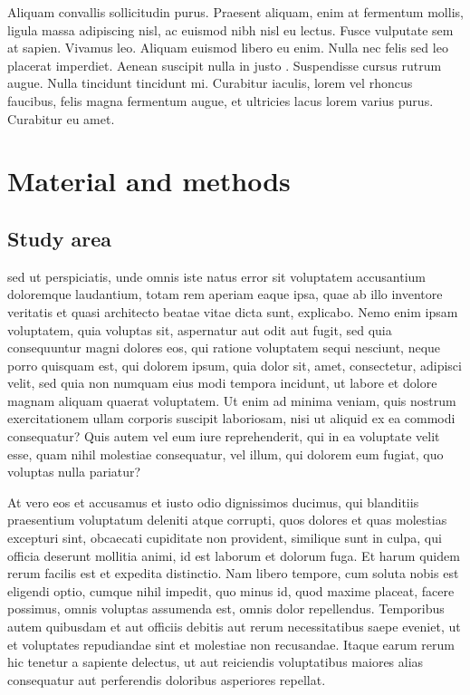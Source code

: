\documentclass[a4paper,12pt]{article}
\begin{document}
Aliquam convallis sollicitudin purus. Praesent aliquam, enim at fermentum mollis, ligula
massa adipiscing nisl, ac euismod nibh nisl eu lectus. Fusce vulputate sem at
sapien. Vivamus leo. Aliquam euismod libero eu enim. Nulla nec felis sed leo placerat
imperdiet. Aenean suscipit nulla in justo
. Suspendisse cursus rutrum augue. Nulla
tincidunt tincidunt mi. Curabitur iaculis, lorem vel rhoncus faucibus, felis magna
fermentum augue, et ultricies lacus lorem varius purus. Curabitur eu amet.


\section*{Material and methods}


\subsection*{Study area}

sed ut perspiciatis, unde omnis iste natus error sit voluptatem
accusantium doloremque laudantium, totam rem aperiam eaque ipsa, quae ab illo inventore
veritatis et quasi architecto beatae vitae dicta sunt, explicabo. Nemo enim ipsam
voluptatem, quia voluptas sit, aspernatur aut odit aut fugit, sed quia consequuntur magni
dolores eos, qui ratione voluptatem sequi nesciunt, neque porro quisquam est, qui dolorem
ipsum, quia dolor sit, amet, consectetur, adipisci velit, sed quia non numquam eius modi
tempora incidunt, ut labore et dolore magnam aliquam quaerat voluptatem. Ut enim ad minima
veniam, quis nostrum exercitationem ullam corporis suscipit laboriosam, nisi ut aliquid ex
ea commodi consequatur? Quis autem vel eum iure reprehenderit, qui in ea voluptate velit
esse, quam nihil molestiae consequatur, vel illum, qui dolorem eum fugiat, quo voluptas
nulla pariatur? 

At vero eos et accusamus et iusto odio dignissimos ducimus, qui blanditiis praesentium
voluptatum deleniti atque corrupti, quos dolores et quas molestias excepturi sint,
 obcaecati cupiditate non provident,
similique sunt in culpa, qui officia deserunt mollitia animi, id est laborum et dolorum
fuga. Et harum quidem rerum facilis est et expedita distinctio. Nam libero tempore, cum
soluta nobis est eligendi optio, cumque nihil impedit, quo minus id, quod maxime placeat,
facere possimus, omnis voluptas assumenda est, omnis dolor repellendus. Temporibus autem
quibusdam et aut officiis debitis aut rerum necessitatibus saepe eveniet, ut et voluptates
repudiandae sint et molestiae non recusandae. Itaque earum rerum hic tenetur a sapiente
delectus, ut aut reiciendis voluptatibus maiores alias consequatur aut perferendis
doloribus asperiores repellat.
\end{document}
